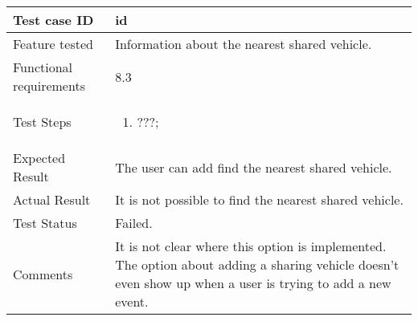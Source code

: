 \begin{table}[H]
	\begin{center}
		\begin{tabular}{ | p{} | p{} | }
		\hline
		Test case ID & id\\
		\hline
		Feature tested & Information about the nearest shared vehicle.\\
    	\hline
		Functional requirements & 8.3  \\
		\hline
		Test Steps & 
			\begin{enumerate}
				\item ???;
			\end{enumerate} \\
		\hline
		Expected Result & The user can add find the nearest shared vehicle.\\
		\hline
		Actual Result & It is not possible to find the nearest shared vehicle.\\ 
		\hline
		Test Status & \color{Red}Failed.\\ 
		\hline
		Comments & It is not clear where this option is implemented. The option about adding a sharing vehicle doesn't even show up when a user is trying to add a new event. \\
		\hline
		
		\end{tabular}
	\end{center}
\end{table}

